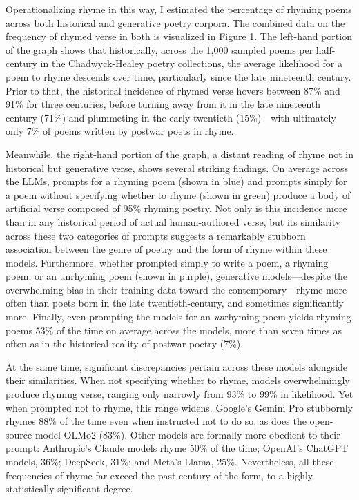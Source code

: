 \documentclass{simple-humanities}         %
\begin{document}
Operationalizing rhyme in this way, I estimated the percentage of rhyming poems across both historical and generative poetry corpora.
The combined data on the frequency of rhymed verse in both is visualized in Figure 1.
The left-hand portion of the graph shows that historically, across the 1,000 sampled poems per half-century in the Chadwyck-Healey poetry collections, the average likelihood for a poem to rhyme descends over time, particularly since the late nineteenth century.
Prior to that, the historical incidence of rhymed verse hovers between 87\% and 91\% for three centuries, before turning away from it in the late nineteenth century (71\%) and plummeting in the early twentieth (15\%)---with ultimately only 7\% of poems written by postwar poets in rhyme.

Meanwhile, the right-hand portion of the graph, a distant reading of rhyme not in historical but generative verse, shows several striking findings.
On average across the LLMs, prompts for a rhyming poem (shown in blue) and prompts simply for a poem without specifying whether to rhyme (shown in green) produce a body of artificial verse composed of 95\% rhyming poetry.
Not only is this incidence more than in any historical period of actual human-authored verse, but its similarity across these two categories of prompts suggests a remarkably stubborn association between the genre of poetry and the form of rhyme within these models.
Furthermore, whether prompted simply to write a poem, a rhyming poem, or an unrhyming poem (shown in purple), generative models---despite the overwhelming bias in their training data toward the contemporary---rhyme more often than poets born in the late twentieth-century, and sometimes significantly more.
Finally, even prompting the models for an \emph{un}rhyming poem yields rhyming poems 53\% of the time on average across the models, more than seven times as often as in the historical reality of postwar poetry (7\%).

At the same time, significant discrepancies pertain across these models alongside their similarities.
When not specifying whether to rhyme, models overwhelmingly produce rhyming verse, ranging only narrowly from 93\% to 99\% in likelihood.
Yet when prompted not to rhyme, this range widens.
Google's Gemini Pro stubbornly rhymes 88\% of the time even when instructed not to do so, as does the open-source model OLMo2 (83\%).
Other models are formally more obedient to their prompt: Anthropic's Claude models rhyme 50\% of the time; OpenAI's ChatGPT models, 36\%; DeepSeek, 31\%; and Meta's Llama, 25\%.
Nevertheless, all these frequencies of rhyme far exceed the past century of the form, to a highly statistically significant degree.
\end{document}
